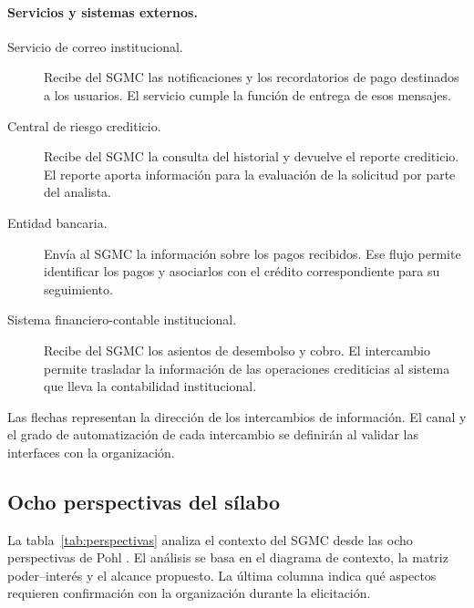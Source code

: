 \documentclass[11pt,a4paper]{article}
\begin{document}
\paragraph{Servicios y sistemas externos.}
\begin{description}
  \item[Servicio de correo institucional.]
  Recibe del SGMC las notificaciones y los recordatorios de pago
  destinados a los usuarios. El servicio cumple la función de entrega
  de esos mensajes.

  \item[Central de riesgo crediticio.]
  Recibe del SGMC la consulta del historial y devuelve el reporte
  crediticio. El reporte aporta información para la evaluación de la
  solicitud por parte del analista.

  \item[Entidad bancaria.]
  Envía al SGMC la información sobre los pagos recibidos. Ese flujo
  permite identificar los pagos y asociarlos con el crédito
  correspondiente para su seguimiento.

  \item[Sistema financiero-contable institucional.]
  Recibe del SGMC los asientos de desembolso y cobro. El intercambio
  permite trasladar la información de las operaciones crediticias
  al sistema que lleva la contabilidad institucional.
\end{description}

Las flechas representan la dirección de los intercambios de
información. El canal y el grado de automatización de cada intercambio
se definirán al validar las interfaces con la organización.

\subsection{Ocho perspectivas del sílabo}

La tabla~\ref{tab:perspectivas} analiza el contexto del SGMC desde las
ocho perspectivas de Pohl \cite{pohl}. El análisis se basa en el
diagrama de contexto, la matriz poder--interés y el alcance propuesto.
La última columna indica qué aspectos requieren confirmación con la
organización durante la elicitación.
\end{document}
